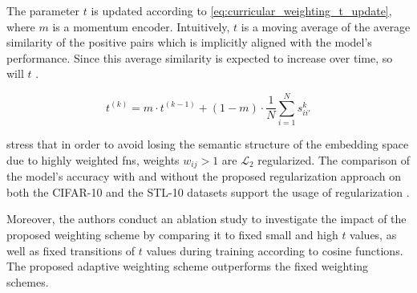 The parameter $t$ is updated according to \eqref{eq:curricular_weighting_t_update}, where $m$ is a momentum encoder.
Intuitively, $t$ is a moving average of the average similarity of the positive pairs 
which is implicitly aligned with the model's performance. 
Since this average similarity is expected to increase over time, so will $t$ \citet{curricular_weighting_2024}.

\begin{equation}
    t^{(k)} = m \cdot t^{(k-1)} + (1-m) \cdot \frac{1}{N}\sum_{i=1}^{N}s^{k}_{ii'} 
    \label{eq:curricular_weighting_t_update}
\end{equation}

\citeauthor{curricular_weighting_2024} stress that in order to avoid losing the semantic structure of the embedding space 
due to highly weighted \acp{fn}, weights $w_{ij} > 1$ are $\mathcal{L}_2$ regularized.
The comparison of the model's accuracy with and without the proposed regularization approach on both the CIFAR-10 and the STL-10 datasets 
support the usage of regularization \citet{curricular_weighting_2024}.

Moreover, the authors conduct an ablation study to investigate the impact of the proposed weighting scheme 
by comparing it to fixed small and high $t$ values, as well as fixed transitions of $t$ values during training according to cosine functions.
The proposed adaptive weighting scheme outperforms the fixed weighting schemes.